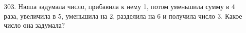 303. Нюша задумала число, прибавила к нему 1, потом уменьшила сумму в 4 раза, увеличила в 5, уменьшила на 2, разделила на 6 и получила число 3. Какое число она задумала?\\
